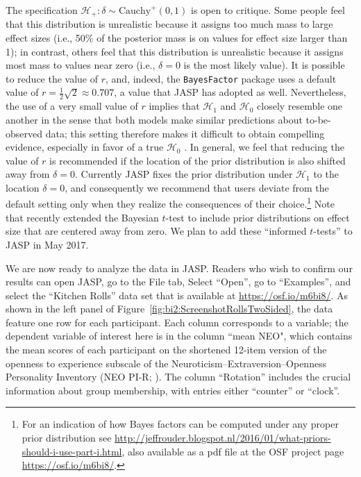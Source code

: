 The specification $\mathcal{H}_+: \delta \sim \text{Cauchy}^+(0,1)$ is open to critique. Some people feel that this distribution is unrealistic because it assigns too much mass to large effect sizes (i.e., 50\% of the posterior mass is on values for effect size larger than 1); in contrast, others feel that this distribution is unrealistic because it assigns most mass to values near zero (i.e., $\delta = 0$ is the most likely value). It is possible to reduce the value of $r$, and, indeed, the \texttt{BayesFactor} package uses a default value of $r = \frac{1}{2}\sqrt{2} \approx 0.707$, a value that JASP has adopted as well. Nevertheless, the use of a very small value of $r$ implies that $\mathcal{H}_1$ and $\mathcal{H}_0$ closely resemble one another in the sense that both models make similar predictions about to-be-observed data; this setting therefore makes it difficult to obtain compelling evidence, especially in favor of a true $\mathcal{H}_0$ \cite{SchoenbrodtEtAlinpress}. In general, we feel that reducing the value of $r$ is recommended if the location of the prior distribution is also shifted away from $\delta = 0$. Currently JASP fixes the prior distribution under $\mathcal{H}_1$ to the location $\delta = 0$, and consequently we recommend that users deviate from the default setting only when they realize the consequences of their choice.\footnote{For an indication of how Bayes factors can be computed under any proper prior distribution see \url{http://jeffrouder.blogspot.nl/2016/01/what-priors-should-i-use-part-i.html}, also available as a pdf file at the OSF project page \url{https://osf.io/m6bi8/}.} Note that  recently extended the Bayesian $t$-test to include prior distributions on effect size that are centered away from zero. We plan to add these ``informed $t$-tests'' to JASP in May 2017.

We are now ready to analyze the data in JASP. Readers who wish to confirm our results can open JASP, go to the File tab, Select ``Open'', go to ``Examples'', and select the ``Kitchen Rolls'' data set that is available at \url{https://osf.io/m6bi8/}. As shown in the left panel of Figure~\ref{fig:bi2:ScreenshotRollsTwoSided}, the data feature one row for each participant. Each column corresponds to a variable; the dependent variable of interest here is in the column ``mean NEO", which contains the mean scores of each participant on the shortened 12-item version of the openness to experience subscale of the Neuroticism--Extraversion--Openness Personality Inventory (NEO PI-R; ). The column ``Rotation'' includes the crucial information about group membership, with entries either ``counter'' or ``clock''.

